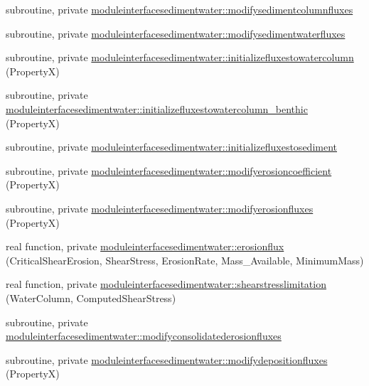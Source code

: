 \begin{DoxyCompactItemize}
\item 
subroutine, private \mbox{\hyperlink{namespacemoduleinterfacesedimentwater_aa69ad0cf59fc330de29ad9983648c806}{moduleinterfacesedimentwater\+::modifysedimentcolumnfluxes}}
\item 
subroutine, private \mbox{\hyperlink{namespacemoduleinterfacesedimentwater_a3c912328a57c38e146a0449318c3ace0}{moduleinterfacesedimentwater\+::modifysedimentwaterfluxes}}
\item 
subroutine, private \mbox{\hyperlink{namespacemoduleinterfacesedimentwater_ad957168b604568b1c6165e52a78a03c6}{moduleinterfacesedimentwater\+::initializefluxestowatercolumn}} (PropertyX)
\item 
subroutine, private \mbox{\hyperlink{namespacemoduleinterfacesedimentwater_a255d03cbe0cabfd03178e57925298607}{moduleinterfacesedimentwater\+::initializefluxestowatercolumn\+\_\+benthic}} (PropertyX)
\item 
subroutine, private \mbox{\hyperlink{namespacemoduleinterfacesedimentwater_a3daecfd36630da785ff12a9ea8c61064}{moduleinterfacesedimentwater\+::initializefluxestosediment}}
\item 
subroutine, private \mbox{\hyperlink{namespacemoduleinterfacesedimentwater_aae597d2dbf7b3014156d4fb4815b25bb}{moduleinterfacesedimentwater\+::modifyerosioncoefficient}} (PropertyX)
\item 
subroutine, private \mbox{\hyperlink{namespacemoduleinterfacesedimentwater_a26bb67acd49cf811c778aa020cef0f2a}{moduleinterfacesedimentwater\+::modifyerosionfluxes}} (PropertyX)
\item 
real function, private \mbox{\hyperlink{namespacemoduleinterfacesedimentwater_a564b97311dc02a020ceaabdd4192ae46}{moduleinterfacesedimentwater\+::erosionflux}} (Critical\+Shear\+Erosion, Shear\+Stress, Erosion\+Rate, Mass\+\_\+\+Available, Minimum\+Mass)
\item 
real function, private \mbox{\hyperlink{namespacemoduleinterfacesedimentwater_ab99914cb84ad28c9ff3848ff2f65536b}{moduleinterfacesedimentwater\+::shearstresslimitation}} (Water\+Column, Computed\+Shear\+Stress)
\item 
subroutine, private \mbox{\hyperlink{namespacemoduleinterfacesedimentwater_a15dcf3dbb1639d562e8cfd2115b95c41}{moduleinterfacesedimentwater\+::modifyconsolidatederosionfluxes}}
\item 
subroutine, private \mbox{\hyperlink{namespacemoduleinterfacesedimentwater_a5d9003ebb144c9e66fe6235c416ea685}{moduleinterfacesedimentwater\+::modifydepositionfluxes}} (PropertyX)
\item 

\end{DoxyCompactItemize}
